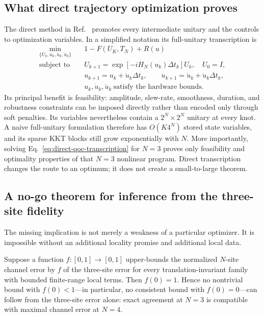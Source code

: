 \subsection{What direct trajectory optimization proves}

The direct method in Ref.~\cite{hu2025universal} promotes every intermediate
unitary and the controls to optimization variables.  In a simplified notation
its full-unitary transcription is
\begin{align}
\min_{\{U_k,u_k,\dot u_k,\ddot u_k\}}
&\quad 1-F(U_K,T_N)+R(u)
\nonumber\\
\text{subject to}
&\quad U_{k+1}=\exp[-iH_N(u_k)\Delta t_k]U_k,
\quad U_0=I,
\label{eq:direct-qoc-transcription}\\
&\quad u_{k+1}=u_k+\dot u_k\Delta t_k,
\qquad
\dot u_{k+1}=\dot u_k+\ddot u_k\Delta t_k,
\nonumber\\
&\quad u_k,\dot u_k,\ddot u_k\ \text{satisfy the hardware bounds}.
\nonumber
\end{align}
Its principal benefit is feasibility: amplitude, slew-rate, smoothness,
duration, and robustness constraints can be imposed directly rather than
encoded only through soft penalties.  Its variables nevertheless contain a
$2^N\times2^N$ unitary at every knot.  A naive full-unitary formulation
therefore has $O(K4^N)$ stored state variables, and its sparse KKT blocks still
grow exponentially with $N$.  More importantly, solving
Eq.~\eqref{eq:direct-qoc-transcription} for $N=3$ proves only feasibility and
optimality properties of that $N=3$ nonlinear program.  Direct transcription
changes the route to an optimum; it does not create a small-to-large theorem.

\subsection{A no-go theorem for inference from the three-site fidelity}

The missing implication is not merely a weakness of a particular optimizer.
It is impossible without an additional locality promise and additional local
data.

\begin{proposition}
\label{prop:three-site-no-go}
Suppose a function $f:[0,1]\to[0,1]$ upper-bounds the normalized $N$-site
channel error by $f$ of the three-site error for every
translation-invariant family with bounded finite-range local terms.  Then
$f(0)=1$.  Hence no nontrivial bound with $f(0)<1$---in particular, no
consistent bound with $f(0)=0$---can follow from the three-site error alone:
exact agreement at $N=3$ is compatible with maximal channel error at $N=4$.
\end{proposition}

